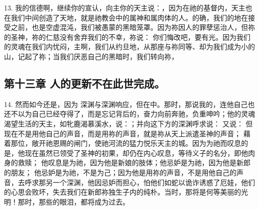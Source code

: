 13. 我的信德啊，继续你的宣认，向主你的天主说：，因为在祂的基督内，天主也在我们中间创造了天地，就是祂教会中的属神和属肉体的人。的确，我们的地在接受之前，也是空虚混沌，我们被愚蒙的黑暗笼罩。因为祢因人的罪孽惩治人，但祢的圣神，祢的仁慈没有舍弃我们的不幸，祢说：  你们悔改吧，要有光。因为我们的灵魂在我们内忧闷，主啊，我们从约旦地，从那座与祢同等、却为我们成为小的山，记起了祢；当我们厌恶自己的黑暗时，我们转向祢，\par


\subsection{第十三章 人的更新不在此世完成。}

14. 然而如今还是，因为 深渊与深渊响应，但在中。那时，那说我的，连他自己也还不以为自己已经夺得了，而是忘记背后的，奋力向前奔驰，负重呻吟；他的灵魂渴望生活的天主，如牝鹿渴慕溪水，说：；并向这下方的深渊呼求说： 又说： 但现在不是用他自己的声音，而是用祢的声音，就是祢从天上派遣圣神的声音； 藉着那位，敞开祂恩赐的闸门，使祂河流的猛力悦乐天主的城。因为为祂而叹息的是，他现在虽然已领受了圣神的初果，却仍在内心叹息，等待义子的名分，即他肉身的救赎； 他叹息是为祂，因为他是新娘的肢体；他忌妒是为祂，因为他是新郎的朋友； 他忌妒是为祂，不是为己；因为他是用祢的声音，不是用他自己的声音，去呼求那另一个深渊，他因忌妒而担心，怕他们如蛇以诡诈诱惑了厄娃，他们的心思会败坏，失去我们在新郎祢独生子内的纯朴。当时，那将是何等美丽的光明！那时，那些的眼泪，都将成为过去。\par

